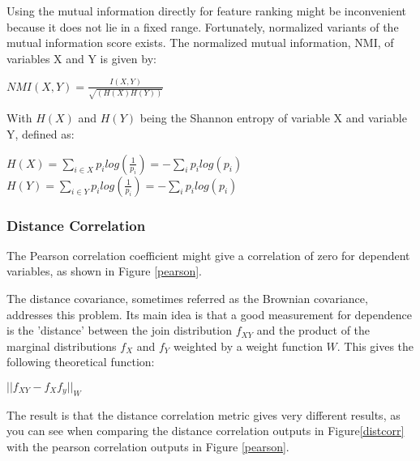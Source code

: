 \npar

Using the mutual information directly for feature ranking might be inconvenient because it does not lie in a fixed range. Fortunately, normalized variants of the mutual information score exists. The normalized mutual information, NMI, of variables X and Y is given by:

\begin{center}
$NMI(X,Y) = \frac{I(X,Y)}{\sqrt{(H(X)H(Y))}}$
\end{center}

With $H(X)$ and $H(Y)$ being the Shannon entropy of variable X and variable Y, defined as:

\begin{center}
$H(X) = \sum\limits_{i\in X} p_ilog(\frac{1}{p_i}) = - \sum\limits_i p_ilog(p_i)$\\
$H(Y) = \sum\limits_{i\in Y} p_ilog(\frac{1}{p_i}) = - \sum\limits_i p_ilog(p_i)$

\end{center}

\subsubsection{Distance Correlation}
The Pearson correlation coefficient might give a correlation of zero for dependent variables, as shown in Figure \ref{pearson}.


The distance covariance, sometimes referred as the Brownian covariance, addresses this problem\citep{distPaper}. Its main idea is that a good measurement for dependence is the 'distance' between the join distribution $f_{XY}$ and the product of the marginal distributions $f_X$ and $f_Y$ weighted by a weight function $W$. This gives the following theoretical function:

\begin{center}
$|| f_{XY} - f_Xf_y||_W$
\end{center}

The result is that the distance correlation metric gives very different results, as you can see when comparing the distance correlation outputs in Figure\ref{distcorr} with the pearson correlation outputs in Figure \ref{pearson}.


